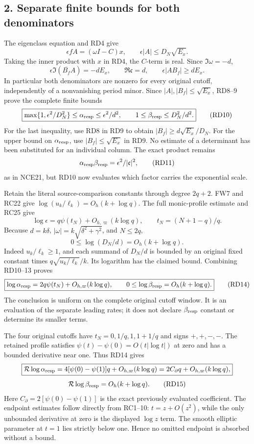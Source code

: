 \documentclass[10pt]{article}
\begin{document}
\subsection{2. Separate finite bounds for both denominators}\label{separate-finite-bounds-for-both-denominators}

The eigenclass equation and RD4 give \[
\epsilon f A=(\omega I-C)x,\qquad
\epsilon|A|\le D_N\sqrt{E_x}.
\tag{RD8}
\] Taking the inner product with \(x\) in RD4, the \(C\)-term is real. Since \(\Im\omega=-d\), \[
\epsilon\Im(\overline{B_f}A)=-dE_x,
\qquad
\Re\mathfrak c=d,
\qquad
\epsilon|A B_f|\ge dE_x.
\tag{RD9}
\] In particular both denominators are nonzero for every original cutoff, independently of a nonvanishing period minor. Since \(|A|,|B_f|\le\sqrt{E_x}\), RD8--9 prove the complete finite bounds \[
\boxed{
\max\{1,\epsilon^2/D_N^2\}\le\alpha_{\rm resp}
\le\epsilon^2/d^2,
\qquad
1\le\beta_{\rm resp}\le D_N^2/d^2.
}
\tag{RD10}
\] For the last inequality, use RD8 in RD9 to obtain \(|B_f|\ge d\sqrt{E_x}/D_N\). For the upper bound on \(\alpha_{\rm resp}\), use \(|B_f|\le\sqrt{E_x}\) in RD9. No estimate of a determinant has been substituted for an individual column. The exact product remains \[
\alpha_{\rm resp}\beta_{\rm resp}
=\epsilon^2/|\mathfrak c|^2,
\tag{RD11}
\] as in NCE21, but RD10 now evaluates which factor carries the exponential scale.

Retain the literal source-comparison constants through degree \(2q+2\). FW7 and RC22 give \(\log(u_k/\ell_k)=O_h(k+\log q)\). The full monic-profile estimate and RC25 give \[
\log\epsilon=q\psi(t_N)+O_{h,\varpi}(k\log q),
\qquad t_N=(N+1-q)/q.
\tag{RD12}
\] Because \(d=k\delta\), \(|\omega|=k\sqrt{\delta^2+\gamma^2}\), and \(N\le2q\), \[
0\le\log(D_N/d)=O_h(k+\log q).
\tag{RD13}
\] Indeed \(u_k/\ell_k\ge1\), and each summand of \(D_N/d\) is bounded by an original fixed constant times \(q\sqrt{u_k/\ell_k}/k\). Its logarithm has the claimed bound. Combining RD10--13 proves \[
\boxed{
\log\alpha_{\rm resp}=2q\psi(t_N)+O_{h,\varpi}(k\log q),
\qquad
0\le\log\beta_{\rm resp}=O_h(k+\log q).
}
\tag{RD14}
\] The conclusion is uniform on the complete original cutoff window. It is an evaluation of the separate leading rates; it does not declare \(\beta_{\rm resp}\) constant or determine its smaller terms.

The four original cutoffs have \(t_N=0,1/q,1,1+1/q\) and signs \(+,+,-,-\). The retained profile satisfies \(\psi(t)-\psi(0)=O(t|\log t|)\) at zero and has a bounded derivative near one. Thus RD14 gives \[
\boxed{
\mathcal R\log\alpha_{\rm resp}
=4[\psi(0)-\psi(1)]q+O_{h,\varpi}(k\log q)
=2C_\partial q+O_{h,\varpi}(k\log q),
}
\] \[
\mathcal R\log\beta_{\rm resp}=O_h(k+\log q).
\tag{RD15}
\] Here \(C_\partial=2[\psi(0)-\psi(1)]\) is the exact previously evaluated coefficient. The endpoint estimates follow directly from RC1--10: \(t=z+O(z^2)\), while the only unbounded derivative at zero is the displayed \(\log z\) term. The smooth elliptic parameter at \(t=1\) lies strictly below one. Hence no omitted endpoint is absorbed without a bound.
\end{document}

